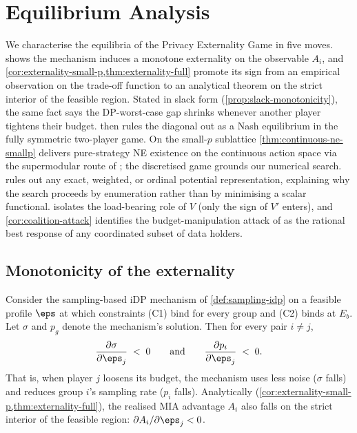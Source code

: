 \section{Equilibrium Analysis}
\label{sec:analysis}

We characterise the equilibria of the Privacy Externality Game in five
moves.  shows the mechanism induces a monotone
externality on the observable $A_i$, and
\cref{cor:externality-small-p,thm:externality-full} promote its sign from
an empirical observation on the trade-off function to an analytical
theorem on the strict interior of the feasible region. Stated in slack
form (\cref{prop:slack-monotonicity}), the same fact says the DP-worst-case
gap shrinks whenever another player tightens their budget.
 then rules the diagonal out as a Nash
equilibrium in the fully symmetric two-player game. On the small-$p$
sublattice \cref{thm:continuous-ne-smallp} delivers pure-strategy NE
existence on the continuous action space via the supermodular route of
\citet{milgrom1990rationalizability}; the discretised game grounds our
numerical search.  rules out any exact,
weighted, or ordinal potential representation, explaining why the search
proceeds by enumeration rather than by minimising a scalar functional.
 isolates the load-bearing role of $V$ (only the
sign of $V'$ enters), and \cref{cor:coalition-attack} identifies the
budget-manipulation attack of \citet{kaiser2026your} as the rational
best response of any coordinated subset of data holders.

\subsection{Monotonicity of the externality}

\begin{lemma}
\label{lem:externality}
Consider the sampling-based iDP mechanism of \cref{def:sampling-idp} on a
feasible profile $\boldsymbol{\eps}$ at which constraints (C1) bind for
every group and (C2) binds at $E_b$. Let $\sigma$ and $p_g$ denote the
mechanism's solution. Then for every pair $i \neq j$,
\begin{equation}
\frac{\partial \sigma}{\partial \eps_j} \;<\; 0
\qquad\textrm{and}\qquad
\frac{\partial p_i}{\partial \eps_j} \;<\; 0.
\label{eq:externality-lemma}
\end{equation}
That is, when player $j$ loosens its budget, the mechanism uses less noise
($\sigma$ falls) and reduces group $i$'s sampling rate ($p_i$ falls).
Analytically (\cref{cor:externality-small-p,thm:externality-full}), the
realised MIA advantage $A_i$ also falls on the strict interior of the
feasible region: $\partial A_i / \partial \eps_j < 0$.
\end{lemma}

